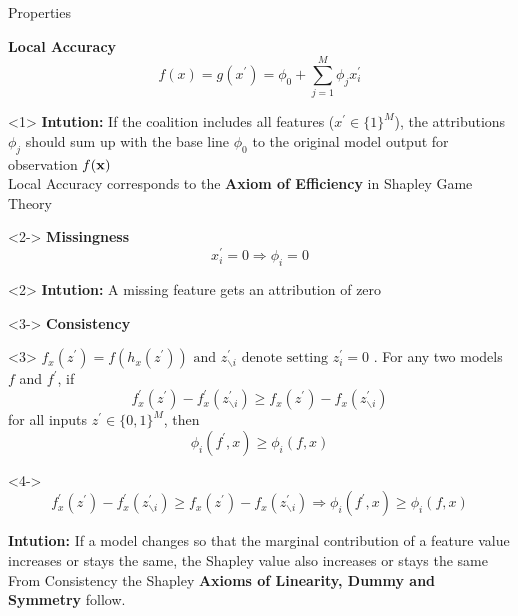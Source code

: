 \documentclass[10pt,compress,t,notes=noshow, xcolor=table]{beamer}
\begin{document}
\begin{vbframe}{Properties}

\textbf{Local Accuracy}
$$
f(x)=g\left(x^{\prime}\right)=\phi_{0}+\sum_{j=1}^{M} \phi_{j} x_{i}^{\prime}
$$
\begin{onlyenv}<1>
\textbf{Intution:} If the coalition includes all features ($x^{\prime}  \in \{1\}^M $), the attributions $\phi_j$ should sum up with the base line $\phi_0$ to the original model output for observation $f(\mathbf{x})$ \\
Local Accuracy corresponds to the \textbf{Axiom of Efficiency} in Shapley Game Theory 

\end{onlyenv}

\begin{onlyenv}<2->
\textbf{Missingness}
$$
x_{i}^{\prime}=0 \Longrightarrow \phi_{i}=0
$$
\end{onlyenv}

\begin{onlyenv}<2>
\textbf{Intution:}  A missing feature gets an attribution of zero
\end{onlyenv}

\begin{onlyenv}<3->
\textbf{Consistency} \\
\end{onlyenv}
\begin{onlyenv}<3>
$f_{x}\left(z^{\prime}\right)=f\left(h_{x}\left(z^{\prime}\right)\right) \text { and } z^{\prime}_{\backslash  i} \text{ denote setting } z_{i}^{\prime}=0$ . For any two
models $f$ and $f^{\prime}$, if
$$
f_{x}^{\prime}\left(z^{\prime}\right)-f_{x}^{\prime}\left(z^{\prime}_{\backslash i}\right) \geq f_{x}\left(z^{\prime}\right)-f_{x}\left(z^{\prime}_{\backslash i}\right)
$$
for all inputs $z^{\prime} \in \{0, 1\}^M$, then
$$
\phi_{i}\left(f^{\prime}, x\right) \geq \phi_{i}(f, x)
$$
\end{onlyenv}

\begin{onlyenv}<4->
$$
f_{x}^{\prime}\left(z^{\prime}\right)-f_{x}^{\prime}\left(z^{\prime}_{\backslash i}\right) \geq f_{x}\left(z^{\prime}\right)-f_{x}\left(z^{\prime} _{\backslash i}\right) \Longrightarrow \phi_{i}\left(f^{\prime}, x\right) \geq \phi_{i}(f, x)
$$

\textbf{Intution:} If a model changes so that the marginal contribution of a feature value increases or stays the same, the Shapley value also increases or stays the same\\ 
From Consistency the Shapley \textbf{Axioms of Linearity, Dummy and Symmetry} follow.
\end{onlyenv}


\end{vbframe}
\end{document}
